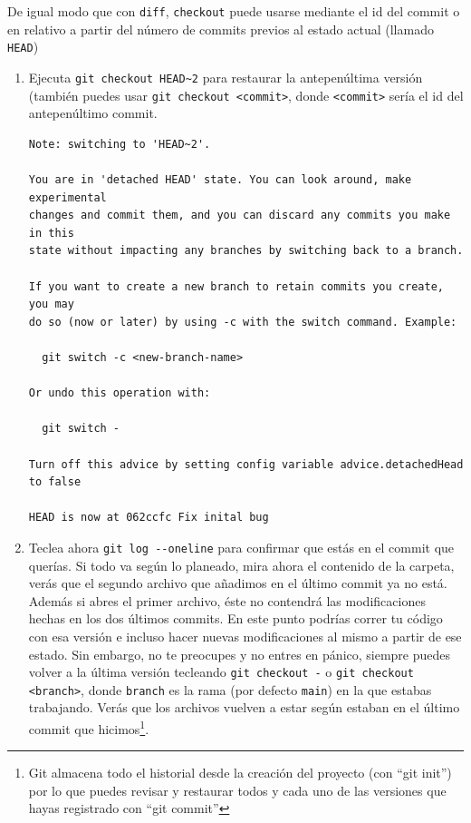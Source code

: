 \documentclass[a4paper,11pt]{report}
\newcommand{\cverb}{\Verb}
\begin{document}
    De igual modo que con \verb+diff+, \verb+checkout+ puede usarse mediante el id del commit o en relativo a partir del número de commits previos al estado actual (llamado \verb+HEAD+)\
    \begin{enumerate}
      \item Ejecuta \cverb+git checkout HEAD~2+ para restaurar la antepenúltima versión (también puedes usar \cverb+git checkout <commit>+, donde \verb+<commit>+ sería el id del antepenúltimo commit.
      
      \begin{lstlisting}[style=custom]
Note: switching to 'HEAD~2'.

You are in 'detached HEAD' state. You can look around, make experimental
changes and commit them, and you can discard any commits you make in this
state without impacting any branches by switching back to a branch.

If you want to create a new branch to retain commits you create, you may
do so (now or later) by using -c with the switch command. Example:

  git switch -c <new-branch-name>

Or undo this operation with:

  git switch -

Turn off this advice by setting config variable advice.detachedHead to false

HEAD is now at 062ccfc Fix inital bug
    \end{lstlisting}
      
    \item Teclea ahora \verb+git log --oneline+ para confirmar que estás en el commit que querías. Si todo va según lo planeado, mira ahora el contenido de la carpeta, verás que el segundo archivo que añadimos en el último commit ya no está. Además si abres el primer archivo, éste no contendrá las modificaciones hechas en los dos últimos commits. En este punto podrías correr tu código con esa versión e incluso hacer nuevas modificaciones al mismo a partir de ese estado. Sin embargo, no te preocupes y no entres en pánico, siempre puedes volver a la última versión tecleando \cverb+git checkout -+ o \cverb+git checkout <branch>+, donde \verb+branch+ es la rama (por defecto \verb+main+) en la que estabas trabajando. Verás que los archivos vuelven a estar según estaban en el último commit que hicimos\footnote{Git almacena todo el historial desde la creación del proyecto (con ``git init'') por lo que puedes revisar y restaurar todos y cada uno de las versiones que hayas registrado con ``git commit''}.


\end{enumerate}
\end{document}
